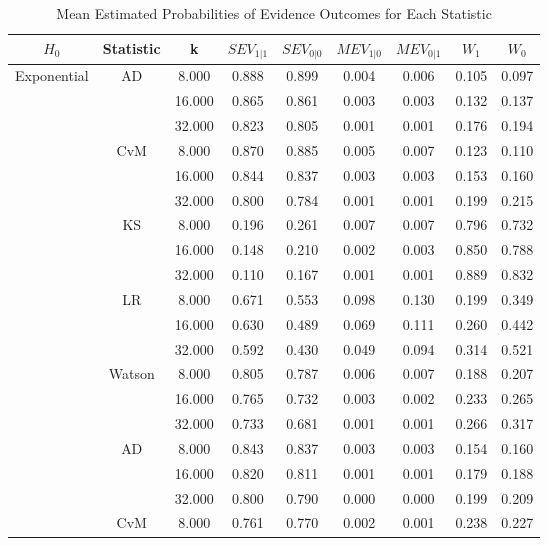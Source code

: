 \documentclass[twoside]{article}
\begin{document}
\begin{table}[ht]
\centering
\scriptsize
\caption{Mean Estimated Probabilities of Evidence Outcomes for Each Statistic } 
\begin{tabular}{ccccccccc}
  \hline
 $H_0$& Statistic &k& $SEV_{1|1}$& $SEV_{0|0}$ & $MEV_{1|0}$ & $MEV_{0|1}$ & $W_{1}$ & $W_{0}$ \\ \hline
    \multirow{18}{*}{Exponential}  &\multirow{3}{*}{AD} & 8.000 & 0.888 & 0.899 & 0.004 & 0.006 & 0.105 & 0.097 \\ 
    &  & 16.000 & 0.865 & 0.861 & 0.003 & 0.003 & 0.132 & 0.137 \\ 
     &  & 32.000 & 0.823 & 0.805 & 0.001 & 0.001 & 0.176 & 0.194 \\  \cline{2-8}
    & \multirow{3}{*}{CvM} & 8.000 & 0.870 & 0.885 & 0.005 & 0.007 & 0.123 & 0.110 \\ 
     &  & 16.000 & 0.844 & 0.837 & 0.003 & 0.003 & 0.153 & 0.160 \\ 
     & & 32.000 & 0.800 & 0.784 & 0.001 & 0.001 & 0.199 & 0.215 \\  \cline{2-8}
     & \multirow{3}{*}{KS} & 8.000 & 0.196 & 0.261 & 0.007 & 0.007 & 0.796 & 0.732 \\ 
    &  & 16.000 & 0.148 & 0.210 & 0.002 & 0.003 & 0.850 & 0.788 \\ 
     &  & 32.000 & 0.110 & 0.167 & 0.001 & 0.001 & 0.889 & 0.832 \\ \cline{2-8}
     &\multirow{3}{*}{LR} & 8.000 & 0.671 & 0.553 & 0.098 & 0.130 & 0.199 & 0.349 \\ 
     &  & 16.000 & 0.630 & 0.489 & 0.069 & 0.111 & 0.260 & 0.442 \\ 
     &  & 32.000 & 0.592 & 0.430 & 0.049 & 0.094 & 0.314 & 0.521 \\  \cline{2-8}
     & \multirow{3}{*}{Watson} & 8.000 & 0.805 & 0.787 & 0.006 & 0.007 & 0.188 & 0.207 \\ 
    &  & 16.000 & 0.765 & 0.732 & 0.003 & 0.002 & 0.233 & 0.265 \\ 
    &  & 32.000 & 0.733 & 0.681 & 0.001 & 0.001 & 0.266 & 0.317 \\ 
    \hline  \hline
  \multirow{18}{*}{Normal}  & \multirow{3}{*}{AD} & 8.000 & 0.843 & 0.837 & 0.003 & 0.003 & 0.154 & 0.160 \\ 
   &  & 16.000 & 0.820 & 0.811 & 0.001 & 0.001 & 0.179 & 0.188 \\ 
   & & 32.000 & 0.800 & 0.790 & 0.000 & 0.000 & 0.199 & 0.209 \\ \cline{2-8}
   & \multirow{3}{*}{CvM} & 8.000 & 0.761 & 0.770 & 0.002 & 0.001 & 0.238 & 0.227 \\ 

\end{tabular}
\end{table}
\end{document}
